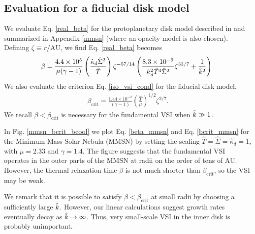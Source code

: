 \subsection{Evaluation for a fiducial disk model}
We evaluate Eq. \ref{real_beta} for the protoplanetary disk model
described in \cite{chiang10} and summarized in Appendix \ref{mmsn}
(where an opacity model is also chosen). Defining $\zeta\equiv
r/\mathrm{AU}$, we find Eq. \ref{real_beta} becomes
\begin{align}\label{beta_mmsn}
\beta =
\frac{4.4\times10^5}{\mu(\gamma-1)}\left(\frac{\hat{\kappa}_d\hat{\Sigma}^2}{\hat{T}}\right)\zeta^{-57/14}\left(\frac{8.3\times10^{-9}}{\hat{\kappa}_d^2\hat{T}^4\hat{\Sigma}^2}\zeta^{33/7}+\frac{1}{\hat{k}^2}\right).    
\end{align}
We also evaluate the criterion Eq. \ref{iso_vsi_cond} for the fiducial
disk model,  
\begin{align}\label{bcrit_mmsn}
  \beta_\mathrm{crit} = \frac{1.44\times10^{-2}}{(\gamma
    -1)}\left(\frac{\hat{T}}{\mu}\right)^{1/2}\zeta^{2/7}. 
\end{align}
We recall $\beta < \beta_\mathrm{crit}$ is necessary for the
fundamental VSI when $\hat{k}\gg 1$. %

In Fig. \ref{mmsn_bcrit_bcool} we plot Eq. \ref{beta_mmsn} and
Eq. \ref{bcrit_mmsn} for the Minimum Mass Solar Nebula (MMSN) by setting
the scaling $\hat{T}=\hat{\Sigma}=\hat{\kappa}_d=1$, with $\mu =
2.33$ and $\gamma=1.4$. The figure suggests that the fundamental VSI
operates in the outer parts of the MMSN at radii on 
the order of tens of AU. However, the thermal relaxation time $\beta$
is not much shorter than $\beta_\mathrm{crit}$, so the VSI may be 
weak.   

We remark that it is possible to satisfy $\beta<\beta_\mathrm{crit}$
at small radii by choosing a sufficiently large $\hat{k}$. However, our
linear calculations suggest growth rates eventually decay as 
$\hat{k}\to\infty$. Thus, very small-scale VSI in the inner disk is
probably unimportant.   

